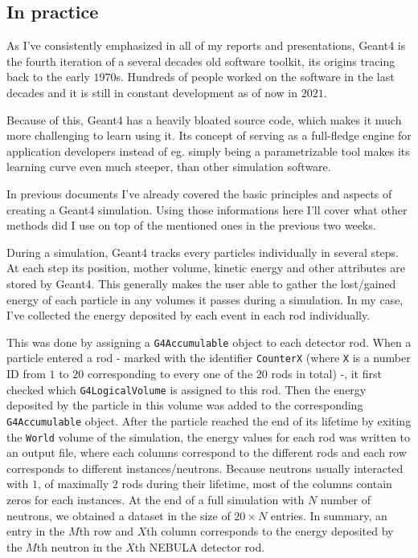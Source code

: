 \begin{multicols}{2}
\subsection{In practice}
As I've consistently emphasized in all of my reports and presentations, Geant4 is the fourth iteration of a several decades old software toolkit, its origins tracing back to the early $1970$s. Hundreds of people worked on the software in the last decades and it is still in constant development as of now in $2021$.

Because of this, Geant4 has a heavily bloated source code, which makes it much more challenging to learn using it. Its concept of serving as a full-fledge engine for application developers instead of eg. simply being a parametrizable tool makes its learning curve even much steeper, than other simulation software.

In previous documents I've already covered the basic principles and aspects of creating a Geant4 simulation. Using those informations here I'll cover what other methods did I use on top of the mentioned ones in the previous two weeks.

During a simulation, Geant4 tracks every particles individually in several steps. At each step its position, mother volume, kinetic energy and other attributes are stored by Geant4. This generally makes the user able to gather the lost/gained energy of each particle in any volumes it passes during a simulation. In my case, I've collected the energy deposited by each event in each rod individually.

This was done by assigning a \texttt{G4Accumulable} object to each detector rod. When a particle entered a rod - marked with the identifier \texttt{CounterX} (where \texttt{X} is a number ID from $1$ to $20$ corresponding to every one of the $20$ rods in total) -, it first checked which \texttt{G4LogicalVolume} is assigned to this rod. Then the energy deposited by the particle in this volume was added to the corresponding \texttt{G4Accumulable} object. After the particle reached the end of its lifetime by exiting the \texttt{World} volume of the simulation, the energy values for each rod was written to an output file, where each columns correspond to the different rods and each row corresponds to different instances/neutrons. Because neutrons usually interacted with $1$, of maximally $2$ rods during their lifetime, most of the columns contain zeros for each instances. At the end of a full simulation with $N$ number of neutrons, we obtained a dataset in the size of $20 \times N$ entries. In summary, an entry in the $M$th row and $X$th column corresponds to the energy deposited by the $M$th neutron in the $X$th NEBULA detector rod.


\end{multicols}
